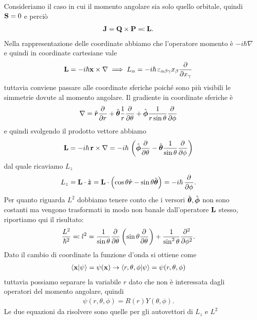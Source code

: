 Consideriamo il caso in cui il momento angolare sia solo quello orbitale, quindi $ \mathbf{S} = 0 $ e perciò 
\begin{align*}
  \mathbf{J} = \mathbf{Q} \times \mathbf{P} \eqcolon \mathbf{L}.
\end{align*}
Nella rappresentazione delle coordinate abbiamo che l'operatore momento è $ -i \hbar \nabla $ e quindi in coordinate cartesiane vale
\begin{align*}
  \mathbf{L} = -i \hbar \mathbf{x} \times \nabla \implies L_\alpha = -i \hbar \,\varepsilon_{\alpha \beta \gamma} x_\beta \frac{\partial^{} {}}{\partial {x_\gamma}^{}}
\end{align*}
tuttavia conviene passare alle coordinate sferiche poiché sono più visibili le simmetrie dovute al momento angolare. Il gradiente in coordinate sferiche 
è 
\begin{align*}
  \nabla = \vers{r} \der{}{r} + \vers{\theta} \frac1r \der{}{\theta} + \vers{\phi} \frac1{r \sin \theta} \der{}{\phi} 
\end{align*}
e quindi svolgendo il prodotto vettore abbiamo
\begin{align*}
  \v{L} = -i \hbar\, \v{r} \times \nabla = -i\hbar \,\left( \vers{\phi} \der{}{\theta} - \vers{\theta} \frac1{\sin \theta} \der{}{\phi} \right)
\end{align*}
dal quale ricaviamo $ L_z $
\begin{align*}
  L_z = \v{L} \cdot \vers{z} = \v{L} \cdot \left(  \cos \theta \vers{r} - \sin \theta \vers{\theta} \right) = -i\hbar \, \der{}{\phi}.
\end{align*}
Per quanto riguarda $ L^2 $ dobbiamo tenere conto che i versori $ \vers{\theta} , \vers{\phi} $ non sono costanti ma vengono trasformati in modo 
non banale dall'operatore $ \mathbf{L} $ stesso, riportiamo qui il risultato:
\begin{align*}
  \frac{L^2}{\hbar^2} \eqcolon l^2 = \frac1{\sin \theta} \der{}{\theta} \left( \sin\theta \der{}{\theta} \right) + \frac1{\sin^2\theta} \der[2]{}{\phi}.
\end{align*}
Dato il cambio di coordinate la funzione d'onda si ottiene come 
\begin{align*}
  \bk{\v{x} | \psi} = \psi(\v{x}) \to \bk{r, \theta, \phi | \psi } = \psi(r, \theta, \phi) 
\end{align*}
tuttavia possiamo separare la variabile $ r $ dato che non è interessata dagli operatori del momento angolare, quindi 
\begin{align*}
  \psi(r,\theta, \phi) = R (r) Y(\theta, \phi).
\end{align*}
Le due equazioni da risolvere sono quelle per gli autovettori di $ L_z  $ e $ L^2 $ 
